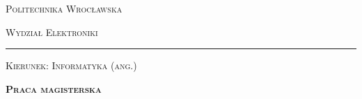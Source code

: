 \titlepage
\addtolength{\textheight}{1.8cm}
\addtolength{\textwidth}{0.2cm}
\addtolength{\topmargin}{-2.2cm}
\enlargethispage{3cm}
\begin{center}
	\begin{Huge}
		\textsc{Politechnika Wrocławska}
	\end{Huge}

	\begin{huge}
		\vspace{1ex}
		\textsc{Wydział Elektroniki}
	\end{huge}
	\rule[-0.3ex]{\textwidth}{1pt}
	
	\begin{flushleft}
		\begin{large}
			\vspace{0.4cm}
			\textsc{Kierunek: Informatyka (ang.)} \newline
		\end{large}
	\end{flushleft}

	\begin{center}
		\begin{Huge}
			\vspace{1.7ex}
			\textsc{\textbf{Praca magisterska}} 

		\end{Huge}
	\end{center}
	\vspace{1cm}
		
	\begin{flushright}
		\begin{minipage}[t][4cm][t]{11cm}
			\begin{center}
				\begin{large}
					\tematen
				\end{large}
			\end{center}
			\vspace{0.3cm}
			\begin{center}
				\begin{large}
					\temat
				\end{large}
			\end{center}
		\end{minipage}
	\end{flushright}
				

\end{center}
